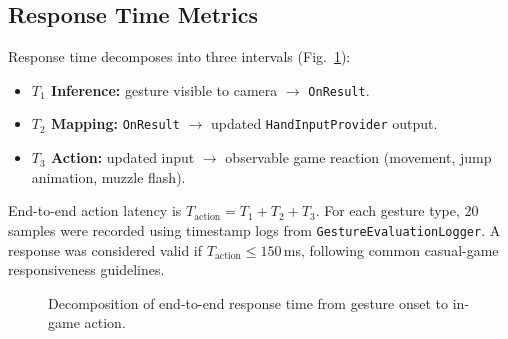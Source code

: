 \documentclass[journal,onecolumn,12pt,draftclsnofoot]{IEEEtran}
\begin{document}
\begin{itemize}
\subsection{Response Time Metrics}
Response time decomposes into three intervals (Fig.~\ref{fig:latency_breakdown}):
\begin{itemize}
\item \textbf{$T_1$ Inference:} gesture visible to camera $\rightarrow$ \texttt{OnResult}.
\item \textbf{$T_2$ Mapping:} \texttt{OnResult} $\rightarrow$ updated \texttt{HandInputProvider} output.
\item \textbf{$T_3$ Action:} updated input $\rightarrow$ observable game reaction (movement, jump animation, muzzle flash).
\end{itemize}
End-to-end action latency is $T_{\text{action}} = T_1 + T_2 + T_3$. For each gesture type, 20 samples were recorded using timestamp logs from \texttt{GestureEvaluationLogger}. A response was considered valid if $T_{\text{action}} \leq 150$\,ms, following common casual-game responsiveness guidelines.

\begin{figure}[htbp]
\centering
{}
\caption{Decomposition of end-to-end response time from gesture onset to in-game action.}
\label{fig:latency_breakdown}
\end{figure}


\end{itemize}
\end{document}
